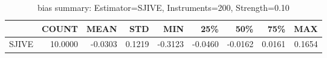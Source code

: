 \begin{table}[ht]
\centering
\caption{bias summary: Estimator=SJIVE, Instruments=200, Strength=0.10}
\begin{tabular}{lrrrrrrrr}
\toprule
 & COUNT & MEAN & STD & MIN & 25\% & 50\% & 75\% & MAX \\
\midrule
SJIVE & 10.0000 & -0.0303 & 0.1219 & -0.3123 & -0.0460 & -0.0162 & 0.0161 & 0.1654 \\
\bottomrule
\end{tabular}
\end{table}
